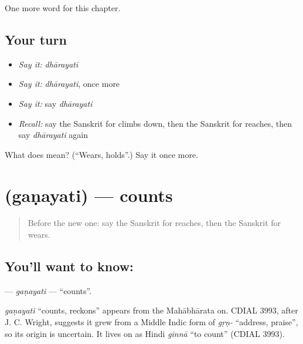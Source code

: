 \begin{grammarlens}[title={What you've built}]
One more word for this chapter.
\end{grammarlens}

\subsection*{Your turn}
\begin{itemize}
\raggedright
  \item \emph{Say it:} \emph{dhārayati}
  \item \emph{Say it:} \emph{dhārayati}, once more
  \item \emph{Say it:} say \emph{dhārayati}
  \item \emph{Recall:} say the Sanskrit for climbs down, then the Sanskrit for reaches, then say \emph{dhārayati} again
\end{itemize}

\begin{tcolorbox}[breakable,colback=teal!4,colframe=teal!35!black,title={Before you move on}]
What does  mean? (\textquotedblleft{}Wears, holds\textquotedblright{}.) Say it once more.
\end{tcolorbox}
\section[\texorpdfstring{\sk{गणयति} (gaṇayati)}{गणयति (gaṇayati)}]{ (gaṇayati) — counts}

\label{lesson:SA-C136-ganayati}



\begin{quote}
Before the new one: say the Sanskrit for reaches, then the Sanskrit for wears.
\end{quote}

\subsection*{You'll want to know: }
\textbf{} — \emph{gaṇayati} — \textquotedblleft{}counts\textquotedblright{}.

\begin{cousinweb}
\emph{gaṇayati} \textquotedblleft{}counts, reckons\textquotedblright{} appears from the Mahābhārata on. CDIAL 3993, after J. C. Wright, suggests it grew from a Middle Indic form of \emph{gṛṇ-} \textquotedblleft{}address, praise\textquotedblright{}, so its origin is uncertain. It lives on as Hindi \emph{ginnā} \textquotedblleft{}to count\textquotedblright{} (CDIAL 3993).
\end{cousinweb}

